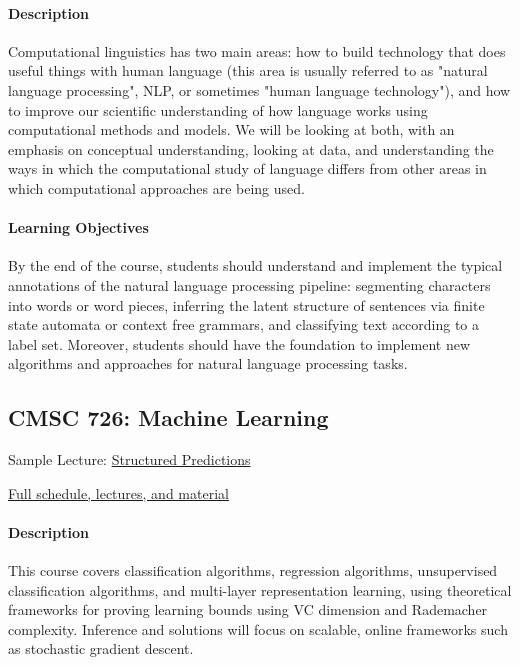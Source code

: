\documentclass{article}
\begin{document}
\paragraph{Description}
Computational linguistics has two main areas: how to build technology that does useful things with human language (this area is usually referred to as "natural language processing", NLP, or sometimes "human language technology"), and how to improve our scientific understanding of how language works using computational methods and models. We will be looking at both, with an emphasis on conceptual understanding, looking at data, and understanding the ways in which the computational study of language differs from other areas in which computational approaches are being used.

\paragraph{Learning Objectives}
By the end of the course, students should understand and implement the typical annotations of the natural language processing pipeline: segmenting characters into words or word pieces, inferring the latent structure of sentences via finite state automata or context free grammars, and classifying text according to a label set.  Moreover, students should have the foundation to implement new algorithms and approaches for natural language processing tasks.


\subsection{CMSC 726: Machine Learning}

\begin{itemize*}
  \item Sample Lecture: \href{https://www.youtube.com/watch?v=Ju2z_WjrIOY}{Structured Predictions}
  \item \href{http://users.umiacs.umd.edu/~jbg/teaching/CMSC_726/}{Full schedule, lectures, and material}
\end{itemize*}

\paragraph{Description}
This course covers classification algorithms, regression algorithms, unsupervised classification algorithms, and multi-layer representation learning, using theoretical frameworks for proving learning bounds using VC dimension and Rademacher complexity.  Inference and solutions will focus on scalable, online frameworks such as stochastic gradient descent.
\end{document}

